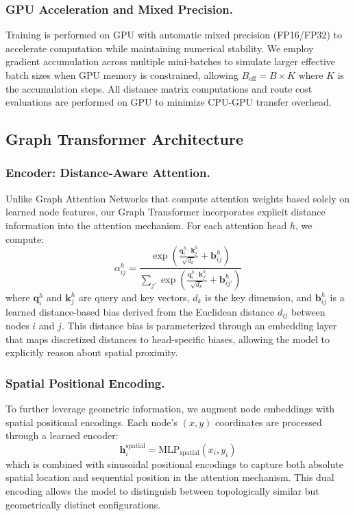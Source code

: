 \subsubsection{GPU Acceleration and Mixed Precision.}
Training is performed on GPU with automatic mixed precision (FP16/FP32) to accelerate computation while maintaining numerical stability. We employ gradient accumulation across multiple mini-batches to simulate larger effective batch sizes when GPU memory is constrained, allowing $B_{\text{eff}} = B \times K$ where $K$ is the accumulation steps. All distance matrix computations and route cost evaluations are performed on GPU to minimize CPU-GPU transfer overhead.

\subsection{Graph Transformer Architecture}

\subsubsection{Encoder: Distance-Aware Attention.}
Unlike Graph Attention Networks that compute attention weights based solely on learned node features, our Graph Transformer incorporates explicit distance information into the attention mechanism. For each attention head $h$, we compute:
\begin{equation}
\alpha_{ij}^h = \frac{\exp\left(\frac{\mathbf{q}_i^h \cdot \mathbf{k}_j^h}{\sqrt{d_k}} + \mathbf{b}_{ij}^h\right)}{\sum_{j'} \exp\left(\frac{\mathbf{q}_i^h \cdot \mathbf{k}_{j'}^h}{\sqrt{d_k}} + \mathbf{b}_{ij'}^h\right)}
\end{equation}
where $\mathbf{q}_i^h$ and $\mathbf{k}_j^h$ are query and key vectors, $d_k$ is the key dimension, and $\mathbf{b}_{ij}^h$ is a learned distance-based bias derived from the Euclidean distance $d_{ij}$ between nodes $i$ and $j$. This distance bias is parameterized through an embedding layer that maps discretized distances to head-specific biases, allowing the model to explicitly reason about spatial proximity.

\subsubsection{Spatial Positional Encoding.}
To further leverage geometric information, we augment node embeddings with spatial positional encodings. Each node's $(x, y)$ coordinates are processed through a learned encoder:
\begin{equation}
\mathbf{h}_i^{\text{spatial}} = \text{MLP}_{\text{spatial}}(x_i, y_i)
\end{equation}
which is combined with sinusoidal positional encodings to capture both absolute spatial location and sequential position in the attention mechanism. This dual encoding allows the model to distinguish between topologically similar but geometrically distinct configurations.

